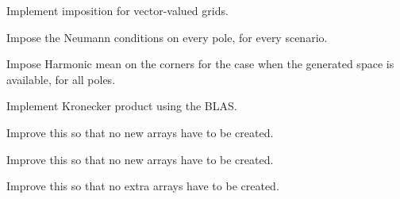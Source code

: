
\begin{DoxyRefList}
\item[\label{todo__todo000014}%
\hypertarget{todo__todo000014}{}%
Member \hyperlink{classmtk_1_1BCDescriptor2D_a5f0ff1fda1b5266dcd77ba2301c8ba2c}{mtk\+:\+:B\+C\+Descriptor2\+D\+:\+:Impose\+On\+Grid} (Uni\+Stg\+Grid2\+D \&grid) const ]Implement imposition for vector-\/valued grids.  
\item[\label{todo__todo000012}%
\hypertarget{todo__todo000012}{}%
Member \hyperlink{classmtk_1_1BCDescriptor2D_a0188a64f242ae6015385a4597934fcda}{mtk\+:\+:B\+C\+Descriptor2\+D\+:\+:Impose\+On\+South\+Boundary\+No\+Space} (const \hyperlink{classmtk_1_1UniStgGrid2D}{mtk\+::\+Uni\+Stg\+Grid2\+D} \&grid, \hyperlink{classmtk_1_1DenseMatrix}{mtk\+::\+Dense\+Matrix} \&matrix, const int \&order\+\_\+accuracy) const ]Impose the Neumann conditions on every pole, for every scenario.  
\item[\label{todo__todo000013}%
\hypertarget{todo__todo000013}{}%
Member \hyperlink{classmtk_1_1BCDescriptor2D_af30c275cf06176a2ae9722014142c810}{mtk\+:\+:B\+C\+Descriptor2\+D\+:\+:Impose\+On\+South\+Boundary\+With\+Space} (const \hyperlink{classmtk_1_1UniStgGrid2D}{mtk\+::\+Uni\+Stg\+Grid2\+D} \&grid, \hyperlink{classmtk_1_1DenseMatrix}{mtk\+::\+Dense\+Matrix} \&matrix, const int \&order\+\_\+accuracy) const ]Impose Harmonic mean on the corners for the case when the generated space is available, for all poles.  
\item[\label{todo__todo000001}%
\hypertarget{todo__todo000001}{}%
Member \hyperlink{classmtk_1_1DenseMatrix_a01d3d8bd502870f93bf3a88a0cc5fb49}{mtk\+:\+:Dense\+Matrix\+:\+:Kron} (const Dense\+Matrix \&aa, const Dense\+Matrix \&bb)]Implement Kronecker product using the B\+L\+A\+S.  
\item[\label{todo__todo000017}%
\hypertarget{todo__todo000017}{}%
Member \hyperlink{classmtk_1_1DenseMatrix_a59b9bea24acf39dca64e8549b3527463}{mtk\+:\+:Dense\+Matrix\+:\+:Order\+Col\+Major} ()]Improve this so that no new arrays have to be created.  
\item[\label{todo__todo000016}%
\hypertarget{todo__todo000016}{}%
Member \hyperlink{classmtk_1_1DenseMatrix_ac2949efba3e8278335d45418c85433e4}{mtk\+:\+:Dense\+Matrix\+:\+:Order\+Row\+Major} ()]Improve this so that no new arrays have to be created.  
\item[\label{todo__todo000015}%
\hypertarget{todo__todo000015}{}%
Member \hyperlink{classmtk_1_1DenseMatrix_a71d9c07ca66e88d97d1fd5012f43138b}{mtk\+:\+:Dense\+Matrix\+:\+:Transpose} ()]Improve this so that no extra arrays have to be created.  

\end{DoxyRefList}
